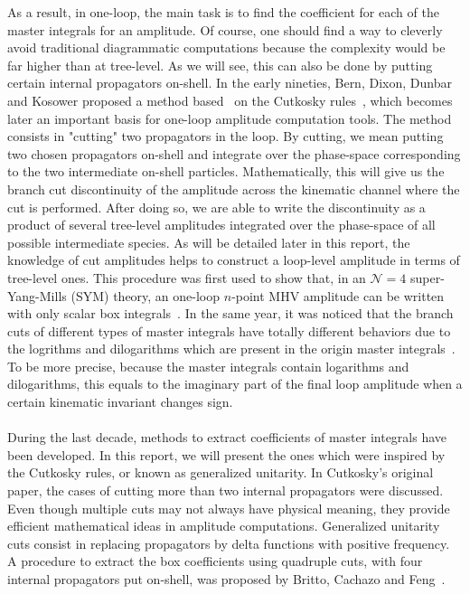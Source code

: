 As a result, in one-loop, the main task is to find the coefficient for each of the master integrals for an amplitude.
Of course, one should find a way to cleverly avoid traditional diagrammatic computations because the complexity would be far higher than at tree-level.
As we will see, this can also be done by putting certain internal propagators on-shell.
In the early nineties, Bern, Dixon, Dunbar and Kosower proposed a method based~\cite{Bern:1994zx} on the Cutkosky rules~\cite{doi:10.1063/1.1703676},  
which becomes later an important basis for one-loop amplitude computation tools.
The method consists in "cutting" two propagators in the loop.
By cutting, we mean putting two chosen propagators on-shell and integrate over the phase-space corresponding to the two intermediate on-shell particles.
Mathematically, this will give us the branch cut discontinuity of the amplitude across the kinematic channel where the cut is performed. 
After doing so, we are able to write the discontinuity as a product of several tree-level amplitudes integrated over the phase-space of all possible intermediate species.
As will be detailed later in this report, the knowledge of cut amplitudes helps to construct a loop-level amplitude in terms of tree-level ones. 
This procedure was first used to show that, in an $\mathcal{N}=4$ super-Yang-Mills (SYM) theory, an one-loop $n$-point MHV amplitude can be written with only scalar box integrals~\cite{Bern:1994zx}.
In the same year, it was noticed that the branch cuts of different types of master integrals have totally different behaviors due to the logrithms and dilogarithms which are present in the origin master integrals~\cite{Bern:1994cg}. 
To be more precise, because the master integrals contain logarithms and dilogarithms, this equals to the imaginary part of the final loop amplitude when a certain kinematic invariant changes sign.
\\\\
During the last decade, methods to extract coefficients of master integrals have been developed.
In this report, we will present the ones which were inspired by the Cutkosky rules, or known as generalized unitarity.
In Cutkosky's original paper, the cases of cutting more than two internal propagators were discussed.
Even though multiple cuts may not always have physical meaning, they provide efficient mathematical ideas in amplitude computations.
Generalized unitarity cuts consist in replacing propagators by delta functions with positive frequency.
A procedure to extract the box coefficients using quadruple cuts, \ie with four internal propagators put on-shell, was proposed by Britto, Cachazo and Feng~\cite{Britto:2004nc}. 
